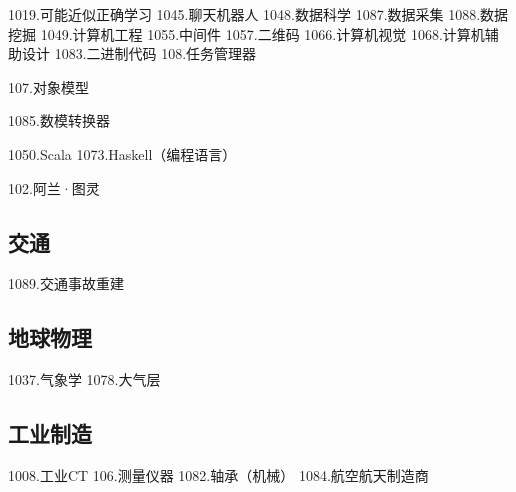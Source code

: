 1019.可能近似正确学习
1045.聊天机器人
1048.数据科学
1087.数据采集
1088.数据挖掘
1049.计算机工程
1055.中间件
1057.二维码
1066.计算机视觉
1068.计算机辅助设计
1083.二进制代码
108.任务管理器

107.对象模型

1085.数模转换器

1050.Scala
1073.Haskell（编程语言）

102.阿兰·图灵


\subsection{交通}
1089.交通事故重建

\subsection{地球物理}
1037.气象学
1078.大气层

\subsection{工业制造}
1008.工业CT
106.测量仪器
1082.轴承（机械）
1084.航空航天制造商
